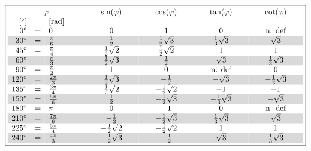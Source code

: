 \[ \boxed{\begin{array}{rclcccc}
\rowcolor{white} \multicolumn{3}{c}{\varphi}  &          \sin(\varphi)&          \cos(\varphi)&          \tan(\varphi)&          \cot(\varphi)\\
\rowcolor{white} \lbrack^\circ\rbrack & &\lbrack\text{rad}\rbrack\qquad&\qquad\qquad\qquad&\qquad\qquad\qquad&\qquad\qquad\qquad&\qquad\qquad\qquad\\
\rowcolor{white} 0^\circ  &=&0                &                      0&                      1&                      0&          \text{n. def}\\
\rowcolor{lgray} 30^\circ &=&\frac{\pi}{6}    &            \frac{1}{2}&    \frac{1}{2}\sqrt{3}&    \frac{1}{3}\sqrt{3}&               \sqrt{3}\\
\rowcolor{white} 45^\circ &=&\frac{\pi}{4}    &    \frac{1}{2}\sqrt{2}&    \frac{1}{2}\sqrt{2}&                      1&                      1\\
\rowcolor{lgray} 60^\circ &=&\frac{\pi}{3}    &    \frac{1}{2}\sqrt{3}&            \frac{1}{2}&               \sqrt{3}&    \frac{1}{3}\sqrt{3}\\
\rowcolor{white} 90^\circ &=&\frac{\pi}{2}    &                      1&                      0&          \text{n. def}&                      0\\
\rowcolor{lgray} 120^\circ&=&\frac{2\pi}{3}   &    \frac{1}{2}\sqrt{3}&           -\frac{1}{2}&              -\sqrt{3}&   -\frac{1}{3}\sqrt{3}\\
\rowcolor{white} 135^\circ&=&\frac{3\pi}{4}   &    \frac{1}{2}\sqrt{2}&   -\frac{1}{2}\sqrt{2}&                     -1&                     -1\\
\rowcolor{lgray} 150^\circ&=&\frac{5\pi}{6}   &            \frac{1}{2}&   -\frac{1}{2}\sqrt{3}&   -\frac{1}{3}\sqrt{3}&              -\sqrt{3}\\
\rowcolor{white} 180^\circ&=&\pi              &                      0&                     -1&                      0&          \text{n. def}\\
\rowcolor{lgray} 210^\circ&=&\frac{7\pi}{6}   &           -\frac{1}{2}&   -\frac{1}{2}\sqrt{3}&    \frac{1}{3}\sqrt{3}&               \sqrt{3}\\
\rowcolor{white} 225^\circ&=&\frac{5\pi}{4}   &   -\frac{1}{2}\sqrt{2}&   -\frac{1}{2}\sqrt{2}&                      1&                      1\\
\rowcolor{lgray} 240^\circ&=&\frac{4\pi}{3}   &   -\frac{1}{2}\sqrt{3}&           -\frac{1}{2}&               \sqrt{3}&    \frac{1}{3}\sqrt{3}\\

\end{array}}\]
